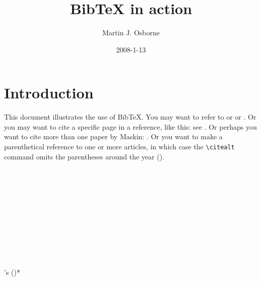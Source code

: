\documentclass[12pt]{article}
\def\citeapos#1{\citeauthor{#1}'s (\citeyear{#1})}
\begin{document}
\title{BibTeX in action}
\author{Martin J. Osborne}
\date{2008-1-13}

\maketitle

\section{Introduction}
This document illustrates the use of BibTeX\@.  You may want to refer to
\cite{ahu61}
 or \cite{ab94} or \cite{m85}.  Or you may want to cite a
specific page in a reference, like this: see \citet[p.~199]{m85}.  Or
perhaps you want to cite more than one paper by Maskin: \cite{m85, m99}.
Or you want to make a parenthetical reference to one or more articles, in which case the \verb+\citealt+ command omits the parentheses around the year (\citealt{ahu61}).

\citet{ahu61}	\\            %
\citet*{ahu61} \\	          %
\citep{ahu61}	 \\           %
\citep*{ahu61}	\\            %
\citep[p.~99]{ahu61} \\	      %
\citep[e.g.][]{ahu61}	\\    %
\citep[e.g.][p.~99]{ahu61} \\ %
\citeauthor{ahu61} \\	      %
\citeauthor*{ahu61} \\	      %
\citeyear{ahu61} \\           %
\citeapos{ahu61}*	 \\       %





\end{document}
